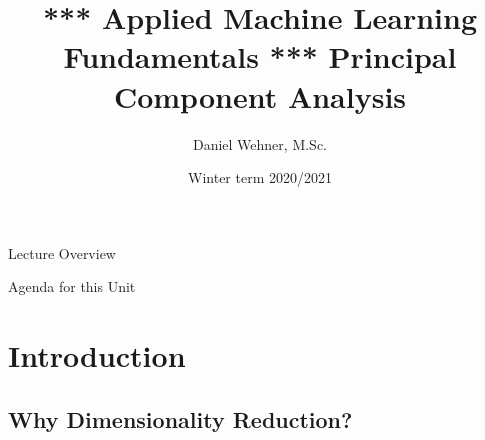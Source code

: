 


\title[Principal Component Analysis]{*** Applied Machine Learning Fundamentals *** Principal Component Analysis}
\author{Daniel Wehner, M.Sc.}
\date{Winter term 2020/2021}




\maketitlepage


\begin{frame}{Lecture Overview}{}
\end{frame}


\begin{frame}{Agenda for this Unit}
	\begin{multicols}{2}
		\tableofcontents
	\end{multicols}
\end{frame}


\section{Introduction}

\subsection{Why Dimensionality Reduction?}

